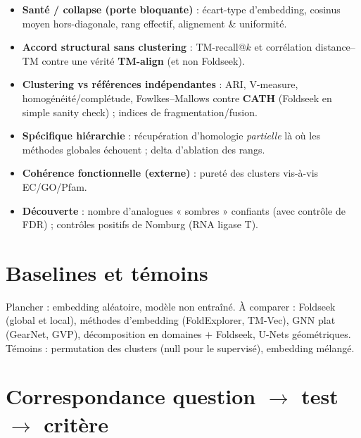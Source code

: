 \documentclass[11pt,a4paper]{article}
\begin{document}
\begin{itemize}[leftmargin=1.4em,itemsep=2pt]
  \item \textbf{Santé / collapse (porte bloquante)} : écart-type d'embedding, cosinus
        moyen hors-diagonale, rang effectif, alignement \& uniformité.
  \item \textbf{Accord structural sans clustering} : TM-recall@$k$ et corrélation
        distance--TM contre une vérité \textbf{TM-align} (et non Foldseek).
  \item \textbf{Clustering vs références indépendantes} : ARI, V-measure,
        homogénéité/complétude, Fowlkes--Mallows contre \textbf{CATH} (Foldseek en
        simple sanity check) ; indices de fragmentation/fusion.
  \item \textbf{Spécifique hiérarchie} : récupération d'homologie \emph{partielle} là
        où les méthodes globales échouent ; delta d'ablation des rangs.
  \item \textbf{Cohérence fonctionnelle (externe)} : pureté des clusters vis-à-vis
        EC/GO/Pfam.
  \item \textbf{Découverte} : nombre d'analogues « sombres » confiants (avec contrôle
        de FDR) ; contrôles positifs de Nomburg (RNA ligase T).
\end{itemize}

\section{Baselines et témoins}
Plancher : embedding aléatoire, modèle non entraîné. À comparer : Foldseek (global et
local), méthodes d'embedding (FoldExplorer, TM-Vec), GNN plat (GearNet, GVP),
décomposition en domaines $+$ Foldseek, U-Nets géométriques. Témoins : permutation des
clusters (null pour le supervisé), embedding mélangé.

\section{Correspondance question $\to$ test $\to$ critère}
\end{document}
